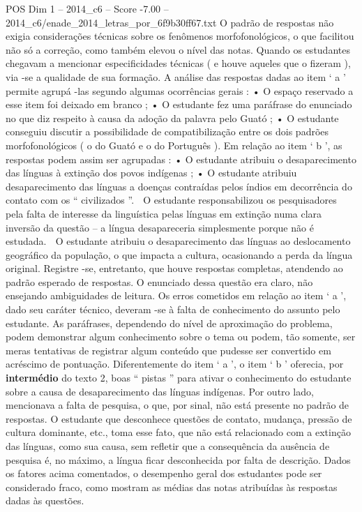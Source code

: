 \begin{textsample}{POS Dim 1 – 2014\_c6 – Score -7.00 – 2014\_c6/enade\_2014\_letras\_por\_6f9b30ff67.txt}
O padrão de respostas não exigia considerações técnicas sobre os fenômenos morfofonológicos, o que facilitou não só a correção, como também elevou o nível das notas.
Quando os estudantes chegavam a mencionar especificidades técnicas ( e houve aqueles que o fizeram ), via -se a qualidade de sua formação.
A análise das respostas dadas ao item ‘ a ’ permite agrupá -las segundo algumas ocorrências gerais : • O espaço reservado a esse item foi deixado em branco ; • O estudante fez uma paráfrase do enunciado no que diz respeito à causa da adoção da palavra pelo Guató ; • O estudante conseguiu discutir a possibilidade de compatibilização entre os dois padrões morfofonológicos ( o do Guató e o do Português ).
Em relação ao item ‘ b ’, as respostas podem assim ser agrupadas : • O estudante atribuiu o desaparecimento das línguas à extinção dos povos indígenas ; • O estudante atribuiu desaparecimento das línguas a doenças contraídas pelos índios em decorrência do contato com os “ civilizados ”.  O estudante responsabilizou os pesquisadores pela falta de interesse da linguística pelas línguas em extinção numa clara inversão da questão – a língua desapareceria simplesmente porque não é estudada.  O estudante atribuiu o desaparecimento das línguas ao deslocamento geográfico da população, o que impacta a cultura, ocasionando a perda da língua original.
Registre -se, entretanto, que houve respostas completas, atendendo ao padrão esperado de respostas.
O enunciado dessa questão era claro, não ensejando ambiguidades de leitura.
Os erros cometidos em relação ao item ‘ a ’, dado seu caráter técnico, deveram -se à falta de conhecimento do assunto pelo estudante.
As paráfrases, dependendo do nível de aproximação do problema, podem demonstrar algum conhecimento sobre o tema ou podem, tão somente, ser meras tentativas de registrar algum conteúdo que pudesse ser convertido em acréscimo de pontuação.
Diferentemente do item ‘ a ’, o item ‘ b ’ oferecia, por \textbf{intermédio} do texto 2, boas “ pistas ” para ativar o conhecimento do estudante sobre a causa de desaparecimento das línguas indígenas.
Por outro lado, mencionava a falta de pesquisa, o que, por sinal, não está presente no padrão de respostas.
O estudante que desconhece questões de contato, mudança, pressão de cultura dominante, etc., toma esse fato, que não está relacionado com a extinção das línguas, como sua causa, sem refletir que a consequência da ausência de pesquisa é, no máximo, a língua ficar desconhecida por falta de descrição.
Dados os fatores acima comentados, o desempenho geral dos estudantes pode ser considerado fraco, como mostram as médias das notas atribuídas às respostas dadas às questões.

\end{textsample}
